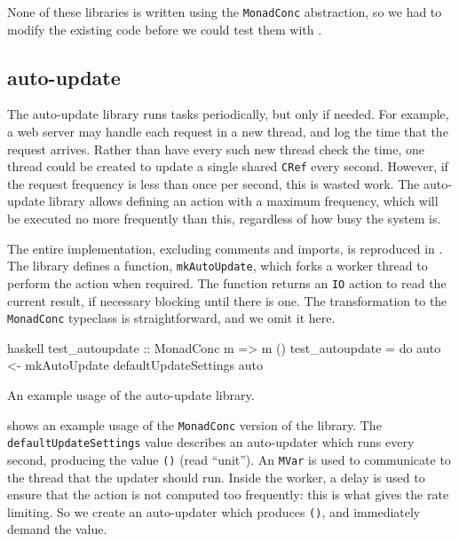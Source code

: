 None of these libraries is written using the \verb|MonadConc|
abstraction, so we had to modify the existing code before we could
test them with \dejafu{}.

\subsection{auto-update}

The auto-update library\cite{auto_update} runs tasks periodically, but
only if needed.  For example, a web server may handle each request in
a new thread, and log the time that the request arrives.  Rather than
have every such new thread check the time, one thread could be created
to update a single shared \verb|CRef| every second.  However, if the
request frequency is less than once per second, this is wasted work.
The auto-update library allows defining an action with a maximum
frequency, which will be executed no more frequently than this,
regardless of how busy the system is.

The entire implementation, excluding comments and imports, is
reproduced in .  The library defines a function,
\verb|mkAutoUpdate|, which forks a worker thread to perform the action
when required.  The function returns an \verb|IO| action to read the
current result, if necessary blocking until there is one.  The
transformation to the \verb|MonadConc| typeclass is straightforward,
and we omit it here.

\begin{listing}
\centering
\begin{cminted}{haskell}
test_autoupdate :: MonadConc m => m ()
test_autoupdate = do
  auto <- mkAutoUpdate defaultUpdateSettings
  auto
\end{cminted}
\caption{An example usage of the auto-update library.}\label{lst:autoupdate_example1}
\end{listing}

 shows an example usage of the
\verb|MonadConc| version of the library.  The
\verb|defaultUpdateSettings| value describes an auto-updater which
runs every second, producing the value \verb|()| (read ``unit'').  An
\verb|MVar| is used to communicate to the thread that the updater
should run.  Inside the worker, a delay is used to ensure that the
action is not computed too frequently: this is what gives the rate
limiting.  So we create an auto-updater which produces \verb|()|, and
immediately demand the value.

